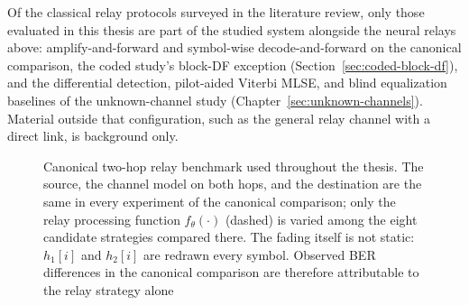 Of the classical relay protocols surveyed in the literature review, only those evaluated in this thesis are part of the studied system alongside the neural relays above: amplify-and-forward and symbol-wise decode-and-forward on the canonical comparison, the coded study's block-DF exception (Section~\ref{sec:coded-block-df}), and the differential detection, pilot-aided Viterbi MLSE, and blind equalization baselines of the unknown-channel study (Chapter~\ref{sec:unknown-channels}). Material outside that configuration, such as the general relay channel with a direct link, is background only.

\begin{figure}[htbp]
\noindent
{}
\caption[Canonical two-hop relay benchmark]{Canonical two-hop relay benchmark used throughout the thesis. The source, the channel model on both hops, and the destination are the same in every experiment of the canonical comparison; only the relay processing function $f_\theta(\cdot)$ (dashed) is varied among the eight candidate strategies compared there. The fading itself is not static: $h_1[i]$ and $h_2[i]$ are redrawn every symbol. Observed BER differences in the canonical comparison are therefore attributable to the relay strategy alone}
\label{fig:canonical-relay-benchmark}
\end{figure}

